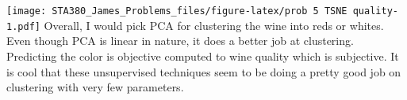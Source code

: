 \documentclass[
]{article}
\begin{document}
\texttt{[image: STA380\_James\_Problems\_files/figure-latex/prob 5 TSNE quality-1.pdf]}
Overall, I would pick PCA for clustering the wine into reds or whites.
Even though PCA is linear in nature, it does a better job at clustering.
Predicting the color is objective computed to wine quality which is
subjective. It is cool that these unsupervised techniques seem to be
doing a pretty good job on clustering with very few parameters.
\end{document}

